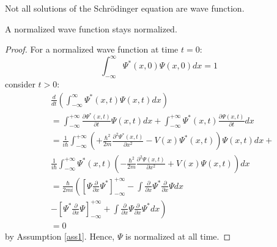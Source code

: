 \begin{remark}
    Not all solutions of the Schrödinger equation are wave function.
\end{remark}
\begin{theorem}
    A normalized wave function stays normalized.
\end{theorem}
\begin{proof}
    For a normalized wave function at time $t=0$:
    $$
        \int_{-\infty}^{\infty} \Psi^{*}(x, 0) \Psi(x, 0) d x=1
    $$
    consider $t>0$:
    $$
        \begin{aligned}
             & \frac{d}{d t}\left(\int_{-\infty}^{\infty} \Psi^{*}(x, t) \Psi(x, t) d x\right)                                                                                                            \\
             & =\int_{-\infty}^{+\infty} \frac{\partial \Psi^{*}(x, t)}{\partial t} \Psi(x, t) d x+\int_{-\infty}^{+\infty} \Psi^{*}(x, t) \frac{\partial \Psi(x, t)}{\partial t} d x                     \\
             & =\frac{1}{i \hbar} \int_{-\infty}^{+\infty}\left(+\frac{\hbar^{2}}{2 m} \frac{\partial^{2} \Psi^{*}(x, t)}{\partial x^{2}}-V(x) \Psi^{*}(x, t)\right) \Psi(x, t) d x+                      \\
             & \frac{1}{i \hbar} \int_{-\infty}^{+\infty} \Psi^{*}(x, t)\left(-\frac{\hbar^{2}}{2 m} \frac{\partial^{2} \Psi(x, t)}{\partial x^{2}}+V(x) \Psi(x, t)\right) d x                            \\
             & =\frac{\hbar}{2 m i}\left(\left[\Psi \frac{\partial}{\partial x} \Psi^{*}\right]_{-\infty}^{+\infty}-\int \frac{\partial}{\partial x} \Psi^{*} \frac{\partial}{\partial x} \Psi d x\right. \\
             & \left.-\left[\Psi^{*}\frac{\partial}{\partial x} \Psi \right]_{-\infty}^{+\infty}+\int \frac{\partial}{\partial x} \Psi \frac{\partial}{\partial x} \Psi^{*} d x\right)                    \\
             & =0
        \end{aligned}
    $$
    by  Assumption \ref{ass1}. Hence, $\Psi$ is normalized at all time.
\end{proof}

